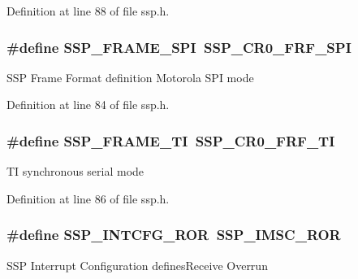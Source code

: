 Definition at line 88 of file ssp.\+h.

\subsubsection[{\texorpdfstring{S\+S\+P\+\_\+\+F\+R\+A\+M\+E\+\_\+\+S\+PI}{SSP_FRAME_SPI}}]{\setlength{\rightskip}{0pt plus 5cm}\#define S\+S\+P\+\_\+\+F\+R\+A\+M\+E\+\_\+\+S\+PI~{\bf S\+S\+P\+\_\+\+C\+R0\+\_\+\+F\+R\+F\+\_\+\+S\+PI}}\hypertarget{group___s_s_p___public___macros_gae60b1441f3ecdb03755304c320d89337}{}\label{group___s_s_p___public___macros_gae60b1441f3ecdb03755304c320d89337}
S\+SP Frame Format definition Motorola S\+PI mode 

Definition at line 84 of file ssp.\+h.

\subsubsection[{\texorpdfstring{S\+S\+P\+\_\+\+F\+R\+A\+M\+E\+\_\+\+TI}{SSP_FRAME_TI}}]{\setlength{\rightskip}{0pt plus 5cm}\#define S\+S\+P\+\_\+\+F\+R\+A\+M\+E\+\_\+\+TI~{\bf S\+S\+P\+\_\+\+C\+R0\+\_\+\+F\+R\+F\+\_\+\+TI}}\hypertarget{group___s_s_p___public___macros_gacc8028fc65d645b5c0ac06863bc8cd9c}{}\label{group___s_s_p___public___macros_gacc8028fc65d645b5c0ac06863bc8cd9c}
TI synchronous serial mode 

Definition at line 86 of file ssp.\+h.

\subsubsection[{\texorpdfstring{S\+S\+P\+\_\+\+I\+N\+T\+C\+F\+G\+\_\+\+R\+OR}{SSP_INTCFG_ROR}}]{\setlength{\rightskip}{0pt plus 5cm}\#define S\+S\+P\+\_\+\+I\+N\+T\+C\+F\+G\+\_\+\+R\+OR~{\bf S\+S\+P\+\_\+\+I\+M\+S\+C\+\_\+\+R\+OR}}\hypertarget{group___s_s_p___public___macros_ga7db87dea06af8ba8368be4dcccfd97d3}{}\label{group___s_s_p___public___macros_ga7db87dea06af8ba8368be4dcccfd97d3}
S\+SP Interrupt Configuration defines\+Receive Overrun 

